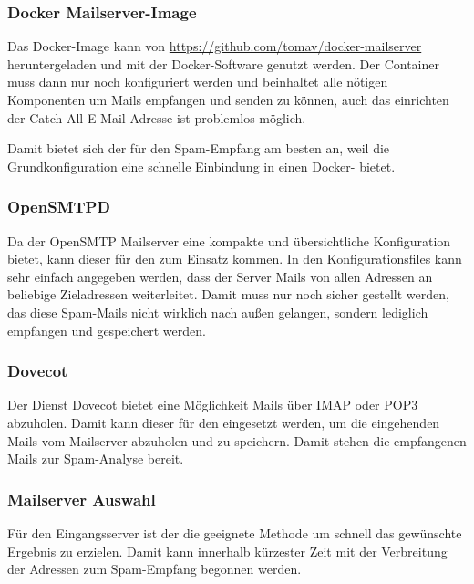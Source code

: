 \documentclass[a4paper,11pt,singlespacing]{article}
\begin{document}
		\subsubsection{Docker Mailserver-Image}\label{sec:AuswahlLösungVorkonfigurierterDockerMailserver}
			Das Docker-Image kann von \url{https://github.com/tomav/docker-mailserver} heruntergeladen und mit der Docker-Software genutzt werden. Der Container muss dann nur noch konfiguriert werden und beinhaltet alle nötigen Komponenten um Mails empfangen und senden zu können, auch das einrichten der Catch-All-E-Mail-Adresse ist problemlos möglich.
			
			Damit bietet sich der  für den Spam-Empfang am besten an, weil die Grundkonfiguration eine schnelle Einbindung in einen Docker- bietet.
		
		\subsubsection{OpenSMTPD}\label{sec:AuswahlLösungOpenSMTPD}
			Da der OpenSMTP Mailserver eine kompakte und übersichtliche Konfiguration bietet, kann dieser für den  zum Einsatz kommen. In den Konfigurationsfiles kann sehr einfach angegeben werden, dass der Server Mails von allen Adressen an beliebige Zieladressen weiterleitet.
			Damit muss nur noch sicher gestellt werden, das diese Spam-Mails nicht wirklich nach au{\ss}en gelangen, sondern lediglich empfangen und gespeichert werden.
		
		\subsubsection{Dovecot}\label{sec:AuswahlLösungDovecot}
		Der Dienst Dovecot bietet eine Möglichkeit Mails über IMAP oder POP3 abzuholen. Damit kann dieser für den  eingesetzt werden, um die eingehenden Mails vom Mailserver abzuholen und zu speichern. Damit stehen die empfangenen Mails zur Spam-Analyse bereit.

		\subsubsection{Mailserver Auswahl}\label{sec:MailserverAuswahl}	
		Für den Eingangsserver ist der  die geeignete Methode um schnell das gewünschte Ergebnis zu erzielen. Damit kann innerhalb kürzester Zeit mit der Verbreitung der Adressen zum Spam-Empfang begonnen werden.
		
\end{document}
